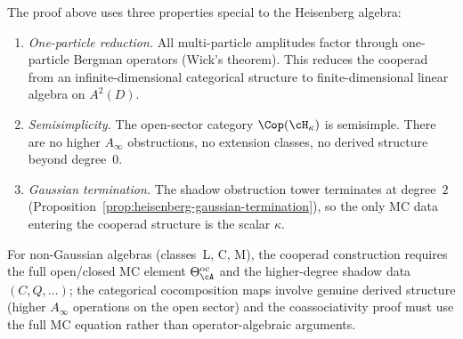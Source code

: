 \begin{remark}
\label{rem:heisenberg-cooperad-special}
The proof above uses three properties special to the
Heisenberg algebra:
\begin{enumerate}[label=\textup{(\alph*)}]
\item \emph{One-particle reduction.} All multi-particle amplitudes
 factor through one-particle Bergman operators (Wick's theorem).
 This reduces the cooperad from an infinite-dimensional categorical
 structure to finite-dimensional linear algebra on $A^2(D)$.
\item \emph{Semisimplicity.} The open-sector category
 $\Cop(\cH_\kappa)$ is semisimple. There are no higher $A_\infty$
 obstructions, no extension classes, no derived structure beyond
 degree~$0$.
\item \emph{Gaussian termination.} The shadow obstruction tower terminates
 at degree~$2$ (Proposition~\ref{prop:heisenberg-gaussian-termination}),
 so the only MC data entering the cooperad structure is the scalar
 $\kappa$.
\end{enumerate}
For non-Gaussian algebras (classes~L, C, M), the cooperad
construction requires the full open/closed MC element
$\Theta^{\mathrm{oc}}_\cA$ and the higher-degree shadow data
$(C, Q, \ldots)$; the categorical cocomposition maps involve
genuine derived structure (higher $A_\infty$ operations on the
open sector) and the coassociativity proof must use the full MC
equation rather than operator-algebraic arguments.
\end{remark}

